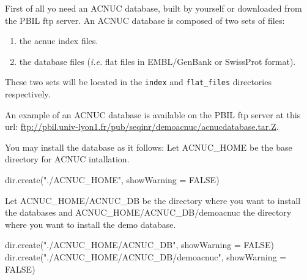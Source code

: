 \documentclass{article}
\begin{document}
First of all yo need an ACNUC database, built by yourself or  downloaded from the PBIL ftp server.
An ACNUC database is composed of two sets of files:
\begin{enumerate}
	\item  the acnuc index files.
	\item  the database files (\textit{i.e.} flat files in EMBL/GenBank or SwissProt format).
\end{enumerate}

These two sets will be located  in the \texttt{index} and  \texttt{flat\_files} directories  respectively.

An example of an ACNUC database is available on the PBIL ftp server  at this url:
\url{ftp://pbil.univ-lyon1.fr/pub/seqinr/demoacnuc/acnucdatabase.tar.Z}.
 
You may install the database as it follows:
Let ACNUC\_HOME be the base directory for ACNUC intallation.

\begin{Schunk}
\begin{Sinput}
 dir.create("./ACNUC_HOME", showWarning = FALSE)
\end{Sinput}
\end{Schunk}


Let ACNUC\_HOME/ACNUC\_DB be the  directory where you want to install the databases and ACNUC\_HOME/ACNUC\_DB/demoacnuc 
the directory where you want to install the demo database.

\begin{Schunk}
\begin{Sinput}
 dir.create("./ACNUC_HOME/ACNUC_DB", showWarning = FALSE)
 dir.create("./ACNUC_HOME/ACNUC_DB/demoacnuc", showWarning = FALSE)
\end{Sinput}
\end{Schunk}
\end{document}
